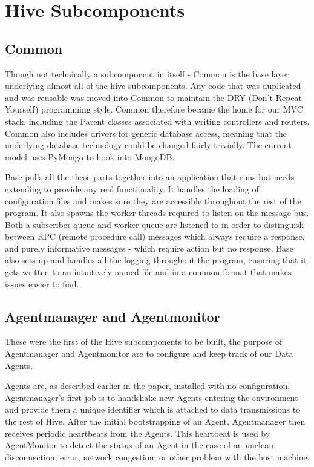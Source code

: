 \section{Hive Subcomponents} \subsection{Common}

Though not technically a subcomponent in itself - Common is the base layer
underlying almost all of the hive subcomponents. Any code that was duplicated
and was reusable was moved into Common to maintain the DRY (Don’t Repeat
Yourself) programming style. Common therefore became the home for our MVC
stack, including the Parent classes associated with writing controllers and
routers. Common also includes drivers for generic database access, meaning that
the underlying database technology could be changed fairly trivially. The
current model uses PyMongo to hook into MongoDB.

Base pulls all the these parts together into an application that runs but needs
extending to provide any real functionality. It handles the loading of
configuration files and makes sure they are accessible throughout the rest of
the program. It also spawns the worker threads required to listen on the
message bus. Both a subscriber queue and worker queue are listened to in order
to distinguish between RPC (remote procedure call) messages which always
require a response, and purely informative messages - which require action but
no response. Base also sets up and handles all the logging throughout the
program, ensuring that it gets written to an intuitively named file and in a
common format that makes issues easier to find.

\subsection{Agentmanager and Agentmonitor}

These were the first of the Hive subcomponents to be built, the purpose of
Agentmanager and Agentmonitor are to configure and keep track of our Data
Agents.

Agents are, as described earlier in the paper, installed with no configuration,
Agentmanager’s first job is to handshake new Agents entering the environment
and provide them a unique identifier which is attached to data transmissions to
the rest of Hive. After the initial bootstrapping of an Agent, Agentmanager
then receives periodic heartbeats from the Agents. This heartbeat is used by
AgentMonitor to detect the status of an Agent in the case of an unclean
disconnection, error, network congestion, or other problem with the host
machine.

